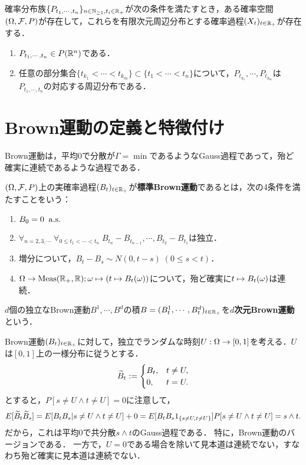 \documentclass[uplatex,dvipdfmx]{jsreport}
\begin{document}
\begin{theorem}[確率過程版]\label{thm-Kolmogorov-extension-theorem}
    確率分布族$\{P_{t_1,\cdots,t_n}\}_{n\in\mathbb{N}_{\ge1},t_i\in\mathbb{R}_+}$が次の条件を満たすとき，ある確率空間$(\Omega,\mathcal{F},P)$が存在して，これらを有限次元周辺分布とする確率過程$(X_t)_{t\in\mathbb{R}_+}$が存在する．
    \begin{enumerate}[({C}1)]
        \item $P_{t_1,\cdots,t_n}\in P(\mathbb{R}^n)$である．
        \item 任意の部分集合$\{t_{k_1}<\cdots<t_{k_m}\}\subset\{t_1<\cdots<t_n\}$について，$P_{t_{k_1}},\cdots,P_{t_{k_m}}$は$P_{t_1,\cdots,t_n}$の対応する周辺分布である．
    \end{enumerate}
\end{theorem}

\section{Brown運動の定義と特徴付け}

\begin{tcolorbox}[colframe=ForestGreen, colback=ForestGreen!10!white,breakable,colbacktitle=ForestGreen!40!white,coltitle=black,fonttitle=\bfseries\sffamily,
title=]
    Brown運動は，平均$0$で分散が$\Gamma=\min$であるようなGauss過程であって，殆ど確実に連続であるような過程である．
\end{tcolorbox}

\begin{definition}
    $(\Omega,\mathcal{F},P)$上の実確率過程$(B_t)_{t\in\mathbb{R}_+}$が\textbf{標準Brown運動}であるとは，次の4条件を満たすことをいう：
    \begin{enumerate}[({B}1)]
        \item $B_0=0\;\;\mathrm{a.s.}$
        \item $\forall_{n=2,3,\cdots}\;\forall_{0\le t_1<\cdots<t_n}\;B_{t_n}-B_{t_{n-1}},\cdots,B_{t_2}-B_{t_1}$は独立．
        \item 増分について，$B_t-B_s\sim N(0,t-s)\;(0\le s<t)$．
        \item $\Omega\to\mathrm{Meas}(\mathbb{R}_+,\mathbb{R});\omega\mapsto(t\mapsto B_t(\omega))$について，殆ど確実に$t\mapsto B_t(\omega)$は連続．
    \end{enumerate}
    $d$個の独立なBrown運動$B^1,\cdots,B^d$の積$B=(B^1_t,\cdots,B^d_t)_{t\in\mathbb{R}_+}$を\textbf{$d$次元Brown運動}という．
\end{definition}
\begin{example}[Brown運動ではない例]
    Brown運動$(B_t)_{t\in\mathbb{R}_+}$に対して，独立でランダムな時刻$U:\Omega\to[0,1]$を考える．$U$は$[0,1]$上の一様分布に従うとする．
    \[\widetilde{B}_t:=\begin{cases}
        B_t,&t\ne U,\\
        0,&t=U.
    \end{cases}\]
    とすると，$P[s\ne U\land t\ne U]=0$に注意して，
    \[E[\widetilde{B}_t\widetilde{B}_s]=E[B_tB_s|s\ne U\land t\ne U]+0=E[B_tB_s1_{\left\{s\ne U,t\ne U\right\}}]P[s\ne U\land t\ne U]=s\land t.\]
    だから，これは平均$0$で共分散$s\land t$のGauss過程である．
    特に，Brown運動のバージョンである．
    一方で，$U=0$である場合を除いて見本道は連続でない，すなわち殆ど確実に見本道は連続でない．
\end{example}
\end{document}
